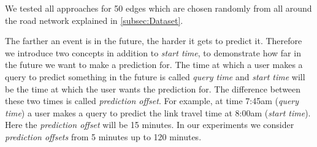 We tested all approaches for 50 edges which are chosen randomly from all around the road network explained in \ref{subsec:Dataset}. 

The farther an event is in the future, the harder it gets to predict it. Therefore we introduce two concepts in addition to \textit{start time}, to demonstrate how far in the future we want to make a prediction for. The time at which a user makes a query to predict something in the future is called
\textit{query time} and \textit{start time} will be the time at which the user wants the prediction for. The difference between these two times is called \textit{prediction offset}. For example, at time 7:45am (\textit{query time}) a user makes a query to predict the link travel time at 8:00am (\textit{start time}). Here the \textit{prediction offset} will be 15 minutes. In our experiments we consider \textit{prediction offsets} from 5 minutes up to 120 minutes.




